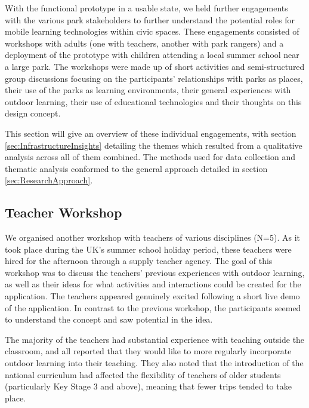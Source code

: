 With the functional prototype in a usable state, we held further engagements with the various park stakeholders to further understand the potential roles for mobile learning technologies within civic spaces. These engagements consisted of workshops with adults (one with teachers, another with park rangers) and a deployment of the prototype with children attending a local summer school near a large park. The workshops were made up of short activities and semi-structured group discussions focusing on the participants’ relationships with parks as places, their use of the parks as learning environments, their general experiences with outdoor learning, their use of educational technologies and their thoughts on this design concept.

This section will give an overview of these individual engagements, with section \ref{sec:InfrastructureInsights} detailing the themes which resulted from a qualitative analysis across all of them combined. The methods used for data collection and thematic analysis conformed to the general approach detailed in section \ref{sec:ResearchApproach}. 

\subsection{Teacher Workshop}

We organised another workshop with teachers of various disciplines (N=5). As it took place during the UK's summer school holiday period, these teachers were hired for the afternoon through a supply teacher agency. The goal of this workshop was to discuss the teachers' previous experiences with outdoor learning, as well as their ideas for what activities and interactions could be created for the application. The teachers appeared genuinely excited following a short live demo of the application. In contrast to the previous workshop, the participants seemed to understand the concept and saw potential in the idea.

The majority of the teachers had substantial experience with teaching outside the classroom, and all reported that they would like to more regularly incorporate outdoor learning into their teaching. They also noted that the introduction of the national curriculum had affected the flexibility of teachers of older students (particularly Key Stage 3 and above), meaning that fewer trips tended to take place. 

